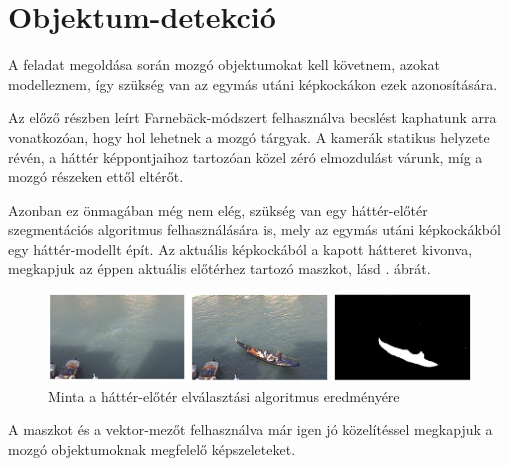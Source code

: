 \section{Objektum-detekció}

A feladat megoldása során mozgó objektumokat kell követnem, azokat modelleznem, így szükség van az egymás utáni képkockákon ezek azonosítására.

Az előző részben leírt Farnebäck-módszert felhasználva becslést kaphatunk arra vonatkozóan, hogy hol lehetnek a mozgó tárgyak. A kamerák statikus helyzete révén, a háttér képpontjaihoz tartozóan közel zéró elmozdulást várunk, míg a mozgó részeken ettől eltérőt.

Azonban ez önmagában még nem elég, szükség van egy háttér-előtér szegmentációs algoritmus \cite{MOG} felhasználására is, mely az egymás utáni képkockákból egy háttér-modellt épít. Az aktuális képkockából a kapott hátteret kivonva, megkapjuk az éppen aktuális előtérhez tartozó maszkot, lásd . ábrát.

\begin{figure}[tbh]
\centering
\includegraphics{figures/mog.png}
\caption{Minta a háttér-előtér elválasztási algoritmus eredményére \cite{mog-example} \label{fig:mog-example}}
\end{figure}

A maszkot és a vektor-mezőt felhasználva már igen jó közelítéssel megkapjuk a mozgó objektumoknak megfelelő képszeleteket.
